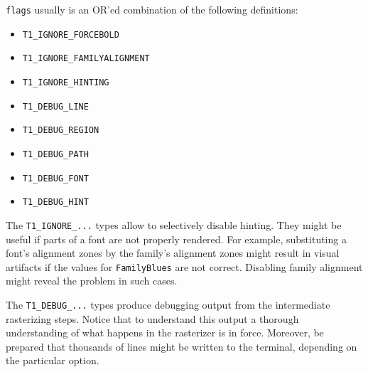 \verb+flags+ usually is an OR'ed combination of the following definitions:
\begin{itemize}
\item \verb+T1_IGNORE_FORCEBOLD+
\item \verb+T1_IGNORE_FAMILYALIGNMENT+
\item \verb+T1_IGNORE_HINTING+
\item \verb+T1_DEBUG_LINE+
\item \verb+T1_DEBUG_REGION+
\item \verb+T1_DEBUG_PATH+
\item \verb+T1_DEBUG_FONT+
\item \verb+T1_DEBUG_HINT+
\end{itemize}
The \verb+T1_IGNORE_...+ types allow to selectively disable hinting. They
might be useful if parts of a font are not properly rendered. For example,
substituting a font's alignment zones by the family's alignment zones might
result in visual artifacts if the values for \verb+FamilyBlues+ are not
correct. Disabling family alignment might reveal the problem in such cases.

The \verb+T1_DEBUG_...+ types produce debugging output from the intermediate
rasterizing steps. Notice that to understand this output a thorough
understanding of what happens in the rasterizer is in force. Moreover, be
prepared that thousands of lines might be written to the terminal, depending
on the particular option.

